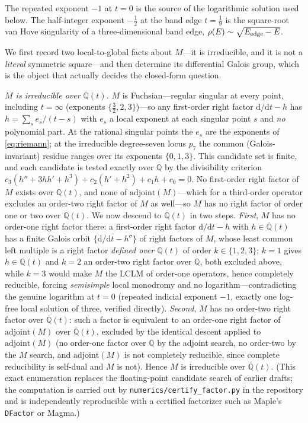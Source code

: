 \documentclass[cntp]{ipart}
\theoremstyle{plain}
\theoremstyle{remark}
\begin{document}
The repeated exponent $-1$ at $t=0$ is the source of the logarithmic solution used
below. The half-integer exponent $-\tfrac12$ at the band edge $t=\tfrac19$ is the square-root van Hove singularity
of a three-dimensional band edge, $\rho(E)\sim\sqrt{E_{\rm edge}-E}$.

We first record two local-to-global facts about $M$---it is irreducible, and it is not a \emph{literal} symmetric
square---and then determine its differential Galois group, which is the object that actually decides the closed-form
question.

\emph{$M$ is irreducible over $\overline{\mathbb{Q}}(t)$.} $M$ is Fuchsian---regular singular at every point,
including $t=\infty$ (exponents $\{\tfrac32,2,3\}$)---so any first-order right factor $\mathrm{d}/\mathrm{d}t-h$
has $h=\sum_s e_s/(t-s)$ with $e_s$ a local exponent at each singular point $s$ and \emph{no} polynomial part. At
the rational singular points the $e_s$ are the exponents of \eqref{eq:riemann}; at the irreducible degree-seven
locus $p_7$ the common (Galois-invariant) residue ranges over its exponents $\{0,1,3\}$. This candidate set is
finite, and each candidate is tested exactly over $\mathbb{Q}$ by the
divisibility criterion $c_3(h''+3hh'+h^3)+c_2(h'+h^2)+c_1h+c_0=0$. No first-order right factor of $M$ exists over
$\mathbb{Q}(t)$, and none of $\mathrm{adjoint}(M)$---which for a third-order operator excludes an order-two right
factor of $M$ as well---so $M$ has no right factor of order one or two over $\mathbb{Q}(t)$. We now descend to
$\overline{\mathbb{Q}}(t)$ in two steps. \emph{First}, $M$ has no order-one right factor there: a first-order right factor
$\mathrm{d}/\mathrm{d}t-h$ with $h\in\overline{\mathbb{Q}}(t)$ has a finite Galois orbit
$\{\mathrm{d}/\mathrm{d}t-h^\sigma\}$ of right factors of $M$, whose least common left multiple is a right factor
\emph{defined over $\mathbb{Q}(t)$} of order $k\in\{1,2,3\}$; $k=1$ gives $h\in\mathbb{Q}(t)$ and $k=2$ an
order-two right factor over $\mathbb{Q}$, both excluded above, while $k=3$ would make $M$ the LCLM of order-one
operators, hence completely reducible, forcing \emph{semisimple} local monodromy and no logarithm---contradicting
the genuine logarithm at $t=0$ (repeated indicial exponent $-1$, exactly one log-free local solution of three,
verified directly). \emph{Second}, $M$ has no order-two right factor over $\overline{\mathbb{Q}}(t)$: such a factor
is equivalent to an order-one right factor of $\mathrm{adjoint}(M)$ over $\overline{\mathbb{Q}}(t)$, excluded by the
identical descent applied to $\mathrm{adjoint}(M)$ (no order-one factor over $\mathbb{Q}$ by the adjoint search, no
order-two by the $M$ search, and $\mathrm{adjoint}(M)$ is not completely reducible, since complete reducibility is
self-dual and $M$ is not). Hence $M$ is irreducible over $\overline{\mathbb{Q}}(t)$.
(This exact enumeration replaces the floating-point candidate search of earlier drafts; the computation is carried
out by \texttt{numerics/certify\_factor.py} in the repository and is independently reproducible with a certified
factorizer such as Maple's \texttt{DFactor} or Magma.)
\end{document}
